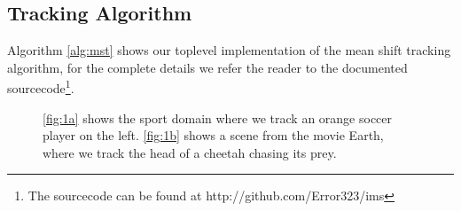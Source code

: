 \documentclass[11pt]{article}
\begin{document}
\subsection{Tracking Algorithm} \label{sec:mst}
Algorithm \ref{alg:mst} shows our toplevel implementation of the mean shift
tracking algorithm, for the complete details we refer the reader to the
documented sourcecode\footnote{The sourcecode can be found at http://github.com/Error323/ims}.

\begin{figure}
\centering
{}
\caption{\ref{fig:1a} shows the sport domain where we track an orange soccer
player on the left. \ref{fig:1b} shows a scene from the movie Earth, where we
track the head of a cheetah chasing its prey.}
\label{fig:videos}
\end{figure}
\end{document}
